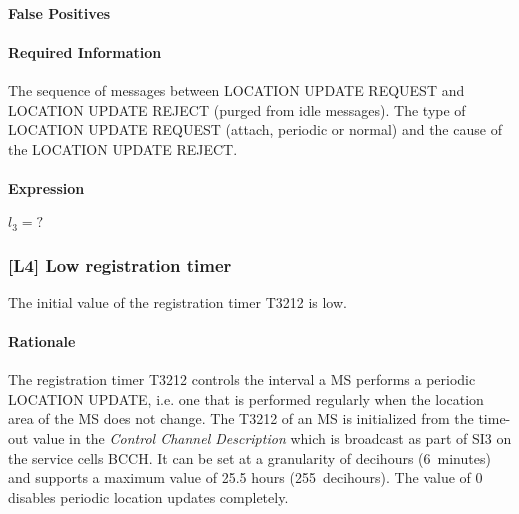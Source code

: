 \documentclass[a4paper,11pt,notitlepage,bigheadings,oneside]{scrartcl}
\begin{document}
\paragraph{False Positives}


\paragraph{Required Information}

The sequence of messages between LOCATION UPDATE REQUEST and LOCATION UPDATE
REJECT (purged from idle messages). The type of LOCATION UPDATE REQUEST
(attach, periodic or normal) and the cause of the LOCATION UPDATE REJECT.

\paragraph{Expression}

$l_3 = ?$


\subsubsection{[L4] Low registration timer}

The initial value of the registration timer T3212 is low.

\paragraph{Rationale}

The registration timer T3212 controls the interval a MS performs a periodic
LOCATION UPDATE, i.e. one that is performed regularly when the location area of
the MS does not change. The T3212 of an MS is initialized from the time-out
value in the \emph{Control Channel Description} which is broadcast as part of
SI3 on the service cells BCCH. It can be set at a granularity of decihours
(6~minutes) and supports a maximum value of 25.5 hours (255~decihours). The
value of 0 disables periodic location updates completely.
\end{document}
